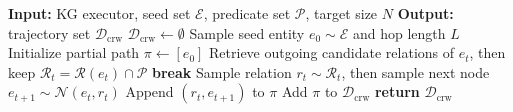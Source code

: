 \begin{algorithm}[ht]
\caption{Constrained Random Walk (CRW)}
\label{alg:crw}
\begin{algorithmic}[1]
\STATE \textbf{Input:} KG executor, seed set $\mathcal{E}$, predicate set $\mathcal{P}$, target size $N$
\STATE \textbf{Output:} trajectory set $\mathcal{D}_{\text{crw}}$
\STATE $\mathcal{D}_{\text{crw}}\leftarrow\emptyset$
  \STATE Sample seed entity $e_0 \sim \mathcal{E}$ and hop length $L$
  \STATE Initialize partial path $\pi\leftarrow[e_0]$
    \STATE Retrieve outgoing candidate relations of $e_t$, then keep $\mathcal{R}_t=\mathcal{R}(e_t)\cap\mathcal{P}$
      \STATE \textbf{break}
    \ENDIF
    \STATE Sample relation $r_t\sim \mathcal{R}_t$, then sample next node $e_{t+1}\sim \mathcal{N}(e_t,r_t)$
    \STATE Append $(r_t,e_{t+1})$ to $\pi$
  \ENDFOR
    \STATE Add $\pi$ to $\mathcal{D}_{\text{crw}}$
  \ENDIF
\ENDWHILE
\STATE \textbf{return} $\mathcal{D}_{\text{crw}}$
\end{algorithmic}
\end{algorithm}